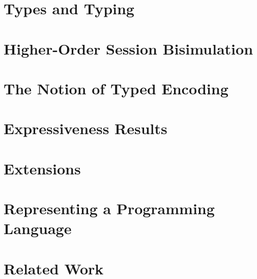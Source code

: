 \documentclass{llncs}
\begin{document}
\section{Types and Typing}
\label{sec:types}


\section{Higher-Order Session Bisimulation}
%

\section{The Notion of Typed Encoding}
\label{s:expr}


\section{Expressiveness Results}
\label{sec:positive}




\section{Extensions}
\label{sec:extension}


\section{Representing a Programming Language}
\label{implementation}


\section{Related Work}
\label{sec:relwork}




%

{}


\newpage
\onecolumn
\appendix 
%
%
%


\end{document}
